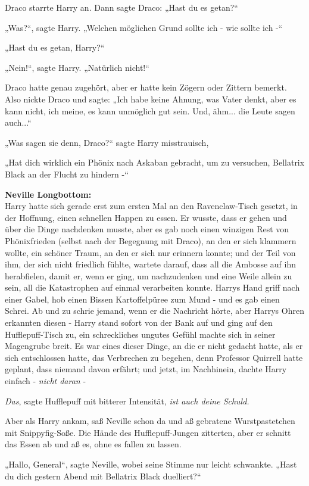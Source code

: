 {Draco starrte Harry an. Dann sagte Draco: „Hast du es getan?“

„Was?“, sagte Harry. „Welchen möglichen Grund sollte ich - wie sollte ich -“

„Hast du es getan, Harry?“

„Nein!“, sagte Harry. „Natürlich nicht!“

Draco hatte genau zugehört, aber er hatte kein Zögern oder Zittern bemerkt. Also nickte Draco und sagte: „Ich habe keine Ahnung, was Vater denkt, aber es kann nicht, ich meine, es kann unmöglich gut sein. Und, ähm... die Leute sagen auch...“

„Was sagen sie denn, Draco?“ sagte Harry misstrauisch,

„Hat dich wirklich ein Phönix nach Askaban gebracht, um zu versuchen, Bellatrix Black an der Flucht zu hindern -“

\textbf{Neville Longbottom:}\\ Harry hatte sich gerade erst zum ersten Mal an den Ravenclaw-Tisch gesetzt, in der Hoffnung, einen schnellen Happen zu essen. Er wusste, dass er gehen und über die Dinge nachdenken musste, aber es gab noch einen winzigen Rest von Phönixfrieden (selbst nach der Begegnung mit Draco), an den er sich klammern wollte, ein schöner Traum, an den er sich nur erinnern konnte; und der Teil von ihm, der sich nicht friedlich fühlte, wartete darauf, dass all die Ambosse auf ihn herabfielen, damit er, wenn er ging, um nachzudenken und eine Weile allein zu sein, all die Katastrophen auf einmal verarbeiten konnte. Harrys Hand griff nach einer Gabel, hob einen Bissen Kartoffelpüree zum Mund - und es gab einen Schrei. Ab und zu schrie jemand, wenn er die Nachricht hörte, aber Harrys Ohren erkannten diesen - Harry stand sofort von der Bank auf und ging auf den Hufflepuff-Tisch zu, ein schreckliches ungutes Gefühl machte sich in seiner Magengrube breit. Es war eines dieser Dinge, an die er nicht gedacht hatte, als er sich entschlossen hatte, das Verbrechen zu begehen, denn Professor Quirrell hatte geplant, dass niemand davon erfährt; und jetzt, im Nachhinein, dachte Harry einfach - \emph{nicht daran} -

\emph{Das}, sagte Hufflepuff mit bitterer Intensität, \emph{ist auch deine Schuld.}

Aber als Harry ankam, saß Neville schon da und aß gebratene Wurstpastetchen mit Snippyfig-Soße. Die Hände des Hufflepuff-Jungen zitterten, aber er schnitt das Essen ab und aß es, ohne es fallen zu lassen.

„Hallo, General“, sagte Neville, wobei seine Stimme nur leicht schwankte. „Hast du dich gestern Abend mit Bellatrix Black duelliert?“

}
